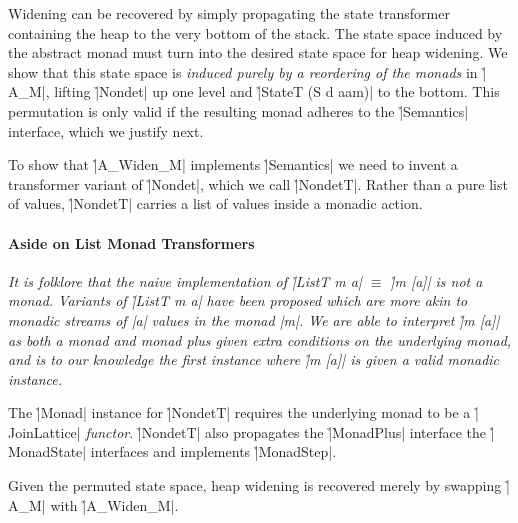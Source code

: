 Widening can be recovered by simply propagating the state transformer
containing the heap to the very bottom of the stack.
%
The state space
%
%
induced by the abstract monad
%
%
must turn into
%
%
the desired state space for heap widening.
%
We show that this state space is \textit{induced purely by a reordering of the
monads} in \h|A_M|, lifting \h|Nondet| up one level and \h|StateT (S d aam)| to
the bottom.
%
%
This permutation is only valid if the resulting monad adheres to the
\h|Semantics| interface, which we justify next.


To show that \h|A_Widen_M| implements \h|Semantics| we need to invent a
transformer variant of \h|Nondet|, which we call \h|NondetT|.
%
Rather than a pure list of values, \h|NondetT| carries a list of values inside
a monadic action.
%


\paragraph{Aside on List Monad Transformers}
{\it
  It is folklore that the naive implementation of \h|ListT m a| $\equiv$ 
  \h|m [a]| is not a monad.
  Variants of \h|ListT m a| have been proposed which are more akin to monadic
  streams of \p|a| values in the monad \p|m|.
  We are able to interpret \h|m [a]| as both a monad and monad plus given extra
  conditions on the underlying monad, and is to our knowledge the first instance
  where \h|m [a]| is given a valid monadic instance.
}


The \h|Monad| instance for \h|NondetT| requires the underlying monad to be a
\h|JoinLattice| \textit{functor}.
%
%
\h|NondetT| also propagates the \h|MonadPlus| interface
%
%
the \h|MonadState| interfaces
%
%
and implements \h|MonadStep|.
%


Given the permuted state space, heap widening is recovered merely by swapping
\h|A_M| with \h|A_Widen_M|.
%

